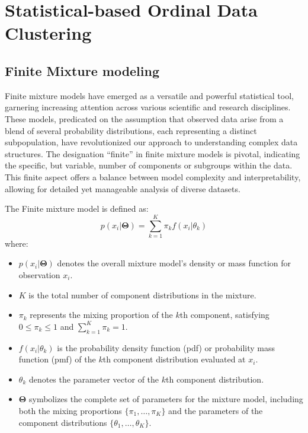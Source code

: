 \documentclass{article}
\begin{document}
\section{Statistical-based Ordinal Data Clustering}

\subsection{Finite Mixture modeling}

Finite mixture models have emerged as a versatile and powerful statistical tool, garnering increasing attention across various scientific and research disciplines. These models, predicated on the assumption that observed data arise from a blend of several probability distributions, each representing a distinct subpopulation, have revolutionized our approach to understanding complex data structures. The designation ``finite'' in finite mixture models is pivotal, indicating the specific, but variable, number of components or subgroups within the data. This finite aspect offers a balance between model complexity and interpretability, allowing for detailed yet manageable analysis of diverse datasets.

The Finite mixture model is defined as:
\begin{equation}
p(x_i|\mathbf{\Theta}) = \sum_{k=1}^{K} \pi_k f(x_i|\theta_k)
\end{equation}
where:
\begin{itemize}
    \item $p(x_i|\mathbf{\Theta})$ denotes the overall mixture model's density or mass function for observation $x_i$.
    \item $K$ is the total number of component distributions in the mixture.
    \item $\pi_k$ represents the mixing proportion of the $k$th component, satisfying $0 \leq \pi_k \leq 1$ and $\sum_{k=1}^{K} \pi_k = 1$.
    \item $f(x_i|\theta_k)$ is the probability density function (pdf) or probability mass function (pmf) of the $k$th component distribution evaluated at $x_i$.
    \item $\theta_k$ denotes the parameter vector of the $k$th component distribution.
    \item $\mathbf{\Theta}$ symbolizes the complete set of parameters for the mixture model, including both the mixing proportions $\{\pi_1, \ldots, \pi_K\}$ and the parameters of the component distributions $\{\theta_1, \ldots, \theta_K\}$.
\end{itemize}
\end{document}
